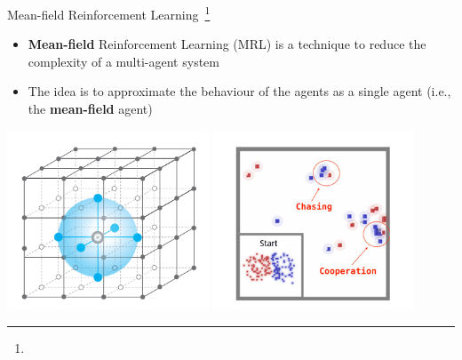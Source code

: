\documentclass[presentation, 8pt]{beamer}\mode<presentation>{\usetheme{AMSBolognaFC}}
\begin{document}
\begin{frame}{Mean-field Reinforcement Learning~\footnote[frame]{}}
	\begin{itemize}
		\item \textbf{Mean-field} Reinforcement Learning (MRL) is a technique to reduce the complexity of a multi-agent system
		\item The idea is to approximate the behaviour of the agents as a single agent (i.e., the \textbf{mean-field} agent)
	\end{itemize}
	\centering
	\includegraphics[width=0.45\textwidth]{img/mean-field.png}
	\centering
	\includegraphics[width=0.45\textwidth]{img/result-mean-field.png}
\end{frame}
\end{document}
